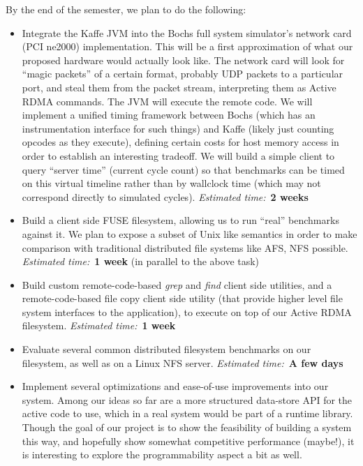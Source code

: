 \documentclass[10pt]{article}
\begin{document}
By the end of the semester, we plan to do the following:

\begin{itemize}
\item Integrate the Kaffe JVM into the Bochs full system simulator's
  network card (PCI ne2000) implementation. This will be a first
  approximation of what our proposed hardware would actually look
  like. The network card will look for ``magic packets'' of a certain
  format, probably UDP packets to a particular port, and steal them
  from the packet stream, interpreting them as Active RDMA
  commands. The JVM will execute the remote code. We will implement a
  unified timing framework between Bochs (which has an instrumentation
  interface for such things) and Kaffe (likely just counting opcodes
  as they execute), defining certain costs for host memory access in
  order to establish an interesting tradeoff. We will build a simple
  client to query ``server time'' (current cycle count) so that
  benchmarks can be timed on this virtual timeline rather than by
  wallclock time (which may not correspond directly to simulated
  cycles). \emph{Estimated time:}~\textbf{2 weeks}

\item Build a client side FUSE filesystem, allowing us to run
  ``real'' benchmarks against it. We plan to expose a subset
  of Unix like semantics in order to make comparison with
  traditional distributed file systems like AFS, NFS possible.
  \emph{Estimated time:}~\textbf{1 week} (in parallel to the above task)

\item Build custom remote-code-based \emph{grep} and \emph{find}
  client side utilities, and a remote-code-based file copy client
  side utility (that provide higher level file system interfaces
  to the application), to execute on top of our Active RDMA filesystem.
  \emph{Estimated time:}~\textbf{1 week}

\item Evaluate several common distributed filesystem benchmarks on our
  filesystem, as well as on a Linux NFS server. \emph{Estimated
  time:}~\textbf{A few days}

\item Implement several optimizations and ease-of-use improvements
  into our system. Among our ideas so far are a more structured
  data-store API for the active code to use, which in a real system
  would be part of a runtime library. Though the goal of our project
  is to show the feasibility of building a system this way, and
  hopefully show somewhat competitive performance (maybe!), it is
  interesting to explore the programmability aspect a bit as well.

\end{itemize}
\end{document}
